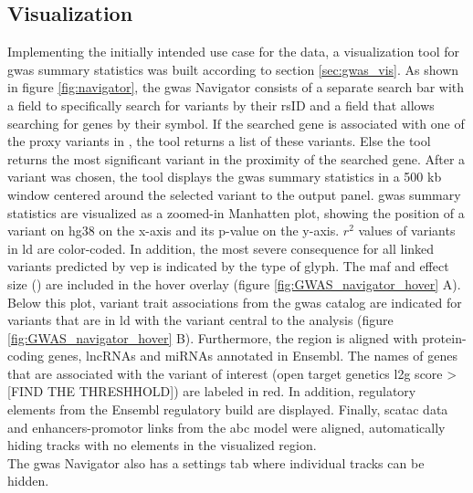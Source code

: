     \subsection{Visualization}
    \label{subsec:result_vis}
    Implementing the initially intended use case for the data, a visualization tool for \ac{gwas} summary statistics was built according to section \ref{sec:gwas_vis}. As shown in figure \ref{fig:navigator}, the \ac{gwas} Navigator consists of a separate search bar with a field to specifically search for variants by their rsID and a field that allows searching for genes by their symbol. If the searched gene is associated with one of the proxy variants in \textcite{aragamDiscoverySystematicCharacterization2021}, the tool returns a list of these variants. Else the tool returns the most significant variant in the proximity of the searched gene. After a variant was chosen, the tool displays the \ac{gwas} summary statistics in a 500 kb window centered around the selected variant to the output panel. \ac{gwas} summary statistics are visualized as a zoomed-in Manhatten plot, showing the position of a variant on \ac{hg38} on the x-axis and its p-value on the y-axis. $r^2$ values of variants in \ac{ld} are color-coded. In addition, the most severe consequence for all linked variants predicted by \ac{vep} is indicated by the type of glyph. The \ac{maf} and effect size (\beta) are included in the hover overlay (figure \ref{fig:GWAS_navigator_hover} A). Below this plot, variant trait associations from the \ac{gwas} catalog are indicated for variants that are in \ac{ld} with the variant central to the analysis (figure \ref{fig:GWAS_navigator_hover} B). Furthermore, the region is aligned with protein-coding genes, \acp{lncRNA} and \acp{miRNA} annotated in Ensembl. The names of genes that are associated with the variant of interest (open target genetics \ac{l2g} score > [FIND THE THRESHHOLD]) are labeled in red. In addition, regulatory elements from the Ensembl regulatory build are displayed. Finally, sc\ac{atac} data and enhancers-promotor links from the \ac{abc} model were aligned, automatically hiding tracks with no elements in the visualized region.\\
    The \ac{gwas} Navigator also has a settings tab where individual tracks can be hidden.

